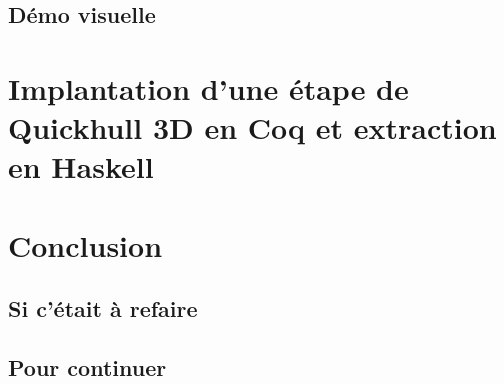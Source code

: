 \documentclass[]{article}
\begin{document}
\subsection{Démo visuelle}

\section{Implantation d'une étape de Quickhull 3D en Coq et extraction en Haskell}

\section{Conclusion}
\subsection{Si c'était à refaire}
\subsection{Pour continuer}
\end{document}
